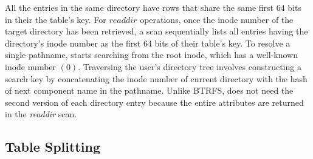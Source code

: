 All the entries in the same directory have rows that 
share the same first 64 bits in their the table's key.
For $readdir$ operations, once the inode number
of the target directory has been retrieved, 
a scan sequentially lists all entries having 
the directory's inode number as the first 64 bits of their table's key. 
To resolve a single pathname, \tfs starts searching from the root inode, 
which has a well-known inode number $(0)$.
Traversing the user's directory tree
involves constructing a search key by concatenating the inode 
number of current directory with the hash of
next component name in the pathname.
Unlike BTRFS, \tfs does not need the second version of each directory entry
because the entire attributes are returned in the \textit{readdir} scan.

\subsection{Table Splitting}


